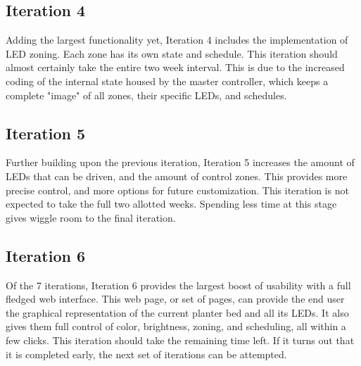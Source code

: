 \documentclass[onecolumn, draftclsnofoot,10pt, compsoc]{IEEEtran}
\begin{document}
		\subsection{Iteration 4}
		Adding the largest functionality yet, Iteration 4 includes the implementation of LED zoning. Each zone has its own state and schedule. This iteration
		should almost certainly take the entire two week interval. This is due to the increased coding of the internal state housed by the master controller, which
		keeps a complete "image" of all zones, their specific LEDs, and schedules.

		\subsection{Iteration 5}
		Further building upon the previous iteration, Iteration 5 increases the amount of LEDs that can be driven, and the amount of control zones. This provides
		more precise control, and more options for future customization. This iteration is not expected to take the full two allotted weeks. Spending less time at
		this stage gives wiggle	room to the final iteration.

		\subsection{Iteration 6}
		Of the 7 iterations, Iteration 6 provides the largest boost of usability with a full fledged web interface. This web page, or set of pages, can provide
		the end	user the graphical representation of the current planter bed and all its LEDs. It also gives them full control of color, brightness, zoning,
		and scheduling, all within a few clicks. This iteration should take the remaining time left. If it turns out that it is completed early, the next set of
		iterations can be attempted.


\end{document}
